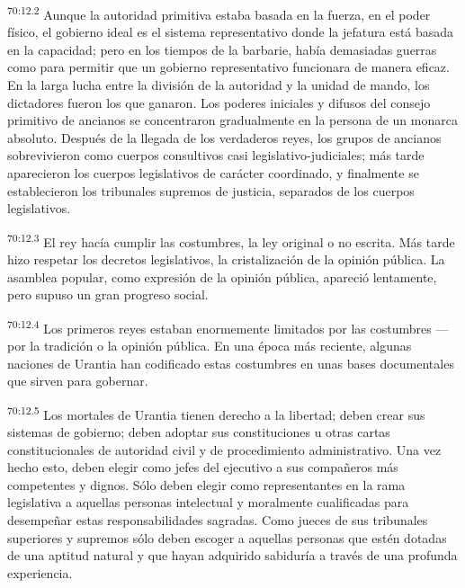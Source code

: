 \par
\textsuperscript{70:12.2} Aunque la autoridad primitiva estaba basada en la fuerza, en el poder físico, el gobierno ideal es el sistema representativo donde la jefatura está basada en la capacidad; pero en los tiempos de la barbarie, había demasiadas guerras como para permitir que un gobierno representativo funcionara de manera eficaz. En la larga lucha entre la división de la autoridad y la unidad de mando, los dictadores fueron los que ganaron. Los poderes iniciales y difusos del consejo primitivo de ancianos se concentraron gradualmente en la persona de un monarca absoluto. Después de la llegada de los verdaderos reyes, los grupos de ancianos sobrevivieron como cuerpos consultivos casi legislativo-judiciales; más tarde aparecieron los cuerpos legislativos de carácter coordinado, y finalmente se establecieron los tribunales supremos de justicia, separados de los cuerpos legislativos.

\par
\textsuperscript{70:12.3} El rey hacía cumplir las costumbres, la ley original o no escrita. Más tarde hizo respetar los decretos legislativos, la cristalización de la opinión pública. La asamblea popular, como expresión de la opinión pública, apareció lentamente, pero supuso un gran progreso social.

\par
\textsuperscript{70:12.4} Los primeros reyes estaban enormemente limitados por las costumbres ---por la tradición o la opinión pública. En una época más reciente, algunas naciones de Urantia han codificado estas costumbres en unas bases documentales que sirven para gobernar.

\par
\textsuperscript{70:12.5} Los mortales de Urantia tienen derecho a la libertad; deben crear sus sistemas de gobierno; deben adoptar sus constituciones u otras cartas constitucionales de autoridad civil y de procedimiento administrativo. Una vez hecho esto, deben elegir como jefes del ejecutivo a sus compañeros más competentes y dignos. Sólo deben elegir como representantes en la rama legislativa a aquellas personas intelectual y moralmente cualificadas para desempeñar estas responsabilidades sagradas. Como jueces de sus tribunales superiores y supremos sólo deben escoger a aquellas personas que estén dotadas de una aptitud natural y que hayan adquirido sabiduría a través de una profunda experiencia.


